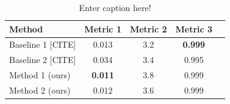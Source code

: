 
\begin{table}[ht]
    \centering
    \begin{tabular}{lcccc}
        \hline
        Method & Metric 1 & Metric 2  & Metric 3 \\
        \hline
        Baseline 1 [CITE] & 0.013 & 3.2 & \textbf{0.999} \\
        Baseline 2 [CITE] & 0.034 & 3.4 & 0.995 \\
        Method 1 (ours) & \textbf{0.011} & 3.8 & 0.999 \\
        Method 2 (ours) & 0.012 & 3.6 & 0.999 \\
    \end{tabular}
    \caption{Enter caption here!}
    \label{table:core_table}
\end{table}





